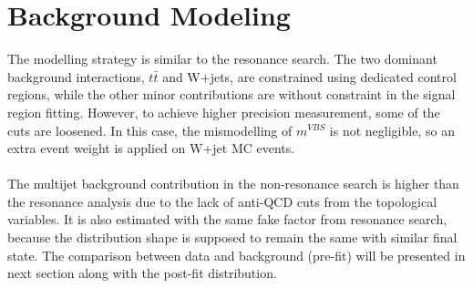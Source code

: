 \section{Background Modeling}
The  modelling strategy is similar to the resonance search. The two dominant background interactions, $t\bar{t}$ and W+jets, are constrained using dedicated control regions, while the other minor contributions are without constraint in the signal region fitting. However, to achieve higher precision measurement, some of the cuts are loosened. In this case, the mismodelling of $m^{VBS}$ is not negligible, so an extra event weight is applied on W+jet MC events.
\\
\\The multijet background contribution in the non-resonance search is higher than the resonance analysis due to the lack of anti-QCD cuts from the topological variables. It is also estimated with the same fake factor from resonance search, because the distribution shape is supposed to remain the same with similar final state. The comparison between data and background (pre-fit) will be presented in next section along with the post-fit distribution. 
